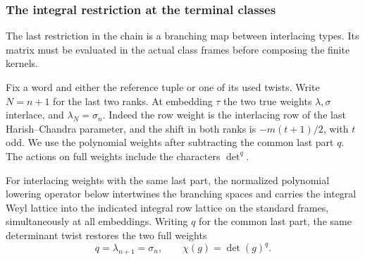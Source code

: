 \subsubsection{The integral restriction at the terminal classes}
\label{subsec:terminal-realization}

The last restriction in the chain is a branching map between interlacing types. Its matrix must be evaluated in the actual class frames before composing the finite kernels.

Fix a word and either the reference tuple or one of its used
twists. Write \(N=n+1\) for the last two ranks. At embedding
\(\tau\) the two true weights \(\lambda,\sigma\) interlace,
and \(\lambda_N=\sigma_n\). Indeed the row weight is the
interlacing row of the last Harish--Chandra parameter, and
the shift in both ranks is \(-m(t+1)/2\), with \(t\) odd.
We use the polynomial weights after subtracting the common
last part \(q\). The actions on full weights include the
characters \(\det^q\).

\begin{proposition}\label{prop:integral-terminal-branching}
For interlacing weights with the same last part, the
normalized polynomial lowering operator below intertwines
the branching spaces and carries the integral Weyl
lattice into the indicated integral row lattice on
the standard frames, simultaneously at all embeddings.
Writing \(q\) for the common last part, the same determinant twist restores the two full weights
\[
 q=\lambda_{n+1}=\sigma_n,\qquad \chi(g)=\det(g)^q.
\]

\end{proposition}

